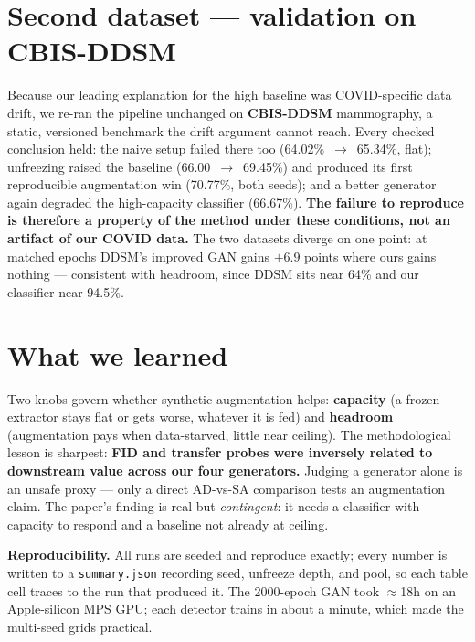 \documentclass[10pt]{article}
\newcommand{\code}[1]{\texttt{\small #1}}
\begin{document}
\section*{Second dataset --- validation on CBIS-DDSM}
Because our leading explanation for the high baseline was COVID-specific data drift, we re-ran the
pipeline unchanged on \textbf{CBIS-DDSM} mammography, a static, versioned benchmark the drift argument
cannot reach. Every checked conclusion held: the naive setup failed there too
(64.02\%~$\to$~65.34\%, flat); unfreezing raised the baseline (66.00~$\to$~69.45\%) and produced its first
reproducible augmentation win (70.77\%, both seeds); and a better generator again degraded the
high-capacity classifier (66.67\%). \textbf{The failure to reproduce is therefore a property of the method
under these conditions, not an artifact of our COVID data.} The two datasets diverge on one point: at
matched epochs DDSM's improved GAN gains $+6.9$ points where ours gains nothing --- consistent with
headroom, since DDSM sits near 64\% and our classifier near 94.5\%.

\section*{What we learned}
Two knobs govern whether synthetic augmentation helps: \textbf{capacity} (a frozen extractor stays flat or
gets worse, whatever it is fed) and \textbf{headroom} (augmentation pays when data-starved, little near
ceiling). The methodological lesson is sharpest: \textbf{FID and transfer probes were inversely related to
downstream value across our four generators.} Judging a generator alone is an unsafe proxy --- only a direct
AD-vs-SA comparison tests an augmentation claim. The paper's finding is real but \emph{contingent}: it needs
a classifier with capacity to respond and a baseline not already at ceiling.

\vspace{2pt}
\noindent\footnotesize\textbf{Reproducibility.} All runs are seeded and reproduce exactly; every number is
written to a \code{summary.json} recording seed, unfreeze depth, and pool, so each table cell traces to the
run that produced it. The 2000-epoch GAN took $\approx$18h on an Apple-silicon MPS GPU; each detector
trains in about a minute, which made the multi-seed grids practical.
\end{document}
